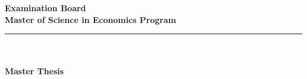 \begin{titlepage}
\begin{center}
                {\bfseries Examination Board} \\[13.2pt]

                {\bfseries Master of Science in Economics Program} \\[12.9pt]

                \rule{\linewidth}{0.25mm} \\[45pt]

                {\fontsize{14}{12}\selectfont \TopicTxt}\\[34pt]

                {\bfseries Master Thesis} \\[92pt]

            \end{center}

            {\\
            }
            
    \endgroup
    
    \thispagestyle{empty}
    
\end{titlepage}


\restoregeometry    %
